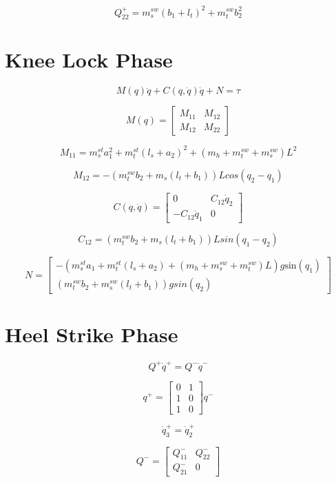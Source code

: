 \[
Q_{22}^{+}=m_{s}^{sw}(b_{1}+l_{t})^{2}+m_{t}^{sw}b_{2}^{2}\]



\section*{Knee Lock Phase}


\[
M(q)\ddot{q}+C(q,\dot{q})\dot{q}+N=\tau\]


\[M(q)=\left[\begin{array}{cc}
M_{11} & M_{12}\\
M_{12} & M_{22}\end{array}\right]
\]

\[
M_{11}=m_{s}^{st}a_{1}^{2}+m_{t}^{st}(l_{s}+a_{2})^{2}+(m_{h}+m_{t}^{sw}+m_{s}^{sw})L^{2}\]


\[
M_{12}=-(m_{t}^{sw}b_{2}+m_{s}(l_{t}+b_{1}))Lcos(q_{2}-q_{1})\]


\[
C(q,\dot{q})=\left[\begin{array}{cc}
0 & C_{12}\dot{q}_{2}\\
-C_{12}\dot{q}_{1} & 0\end{array}\right]
\]

\[
C_{12}=(m_{t}^{sw}b_{2}+m_{s}(l_{t}+b_{1}))Lsin(q_{1}-q_{2})
\]

\[
N=\left[\begin{array}{c}
-(m_{s}^{st}a_{1}+m_{t}^{st}(l_{s}+a_{2})+(m_{h}+m_{s}^{sw}+m_{t}^{sw})L)g\mathbf{\mathrm{sin}}(q_{1})\\
(m_{t}^{sw}b_{2}+m_{s}^{sw}(l_{t}+b_{1}))gsin(q_{2})\end{array}\right]
\]

\section*{Heel Strike Phase}

\[
Q^{+}\dot{q}^{+}=Q^{-}\dot{q}^{-}\]



\[
q^{+}=\left[\begin{array}{cc}
0 & 1\\
1 & 0\\
1 & 0\end{array}\right]q^{-}\]




\[
\dot{q}_{3}^{+}=\dot{q}_{2}^{+}\]


\[
Q^{-}=\left[\begin{array}{cc}
Q_{11}^{-} & Q_{22}^{-}\\
Q_{21}^{-} & 0\end{array}\right]\]


